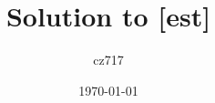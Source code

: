 \documentclass[a4paper]{report}
\begin{document}
  \title{Solution to [est]}
  \author{cz717}
  \date{\today}
  \maketitle





\end{document}
